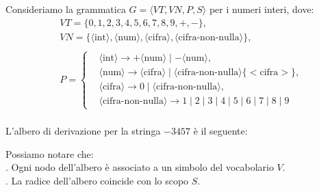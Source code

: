 \documentclass{article}
\begin{document}
\noindent
\begin{example}
\noindent Consideriamo la grammatica \( G = \langle VT, VN, P, S \rangle \) per i numeri interi, dove:
\[
\begin{aligned}
    &VT = \{0, 1, 2, 3, 4, 5, 6, 7, 8, 9, +, -\}, \\
    &VN = \{\langle \text{int} \rangle, \langle \text{num} \rangle, \langle \text{cifra} \rangle, \langle \text{cifra-non-nulla} \rangle\}, \\
    \\
    &P =
        \begin{cases}
            
            &\langle \text{int} \rangle \rightarrow + \langle \text{num} \rangle \mid - \langle \text{num} \rangle, \\[1ex]
            &\langle \text{num} \rangle \rightarrow \langle \text{cifra} \rangle \mid \langle \text{cifra-non-nulla} \rangle \{ \text{$<$cifra$>$} \}, \\
            &\langle \text{cifra} \rangle \rightarrow 0 \mid \langle \text{cifra-non-nulla} \rangle, \\
            &\langle \text{cifra-non-nulla} \rangle \rightarrow 1 \mid 2 \mid 3 \mid 4 \mid 5 \mid 6 \mid 7 \mid 8 \mid 9
        \end{cases}
\end{aligned}
\]
\\\noindent
L'albero di derivazione per la stringa \(-3457\) è il seguente:
\\\noindent
\begin{center}
\end{center}
\end{example} 
\noindent Possiamo notare che:
\\. Ogni nodo dell'albero è associato a un simbolo del vocabolario \( V \).
\\. La radice dell'albero coincide con lo scopo \( S \).
\end{document}
